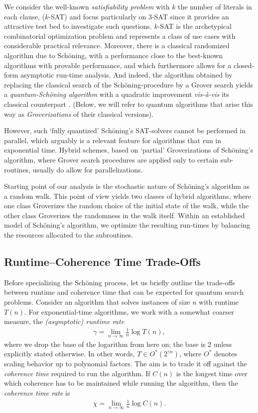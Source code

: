 \documentclass[a4paper,aps,floatfix]{revtex4}
\begin{document}
We consider the well-known \emph{satisfiability problem} with $k$ the number of literals in each clause, ($k$-SAT) and focus particularly on $3$-SAT since it provides an attractive test bed to investigate such questions. $k$-SAT is the archetypical combinatorial optimization problem and represents a class of use cases with considerable practical relevance. 
Moreover, there is a classical randomized algorithm \cite{Schoening99,SchoeningToranBook}
due to Sch\"oning, with a performance close to the best-known algorithms with provable performance, and which furthermore allows for a closed-form asymptotic run-time analysis. And indeed, the algorithm obtained by replacing the classical search of the Sch\"oning-procedure by a Grover search \cite{Grover96} yields a \emph{quantum-Sch\"oning algorithm} with a quadratic improvement \emph{vis-\`a-vis} its classical counterpart \cite{Ambainis04}. 
(Below, we will refer to quantum algorithms that arise this way as \emph{Groverizations} of their classical versions).

However, such `fully quantized' Sch\"oning's SAT-solvers cannot be performed in parallel, which arguably is a relevant feature for algorithms that run in exponential time. Hybrid schemes, based on `partial' Groverizations of Sch\"oning's algorithm, where Grover search procedures are applied only to certain sub-routines, usually do allow for parallelizations.

Starting point of our analysis is the stochastic nature of Sch\"oning's algorithm as a random walk. 
This point of view yields two classes of hybrid algorithms, where one class Groverizes the random choice of the initial state of the walk, while the other class Groverizes the randomness in the walk itself. 
Within an established model of Sch\"oning's algorithm, we optimize the resulting run-times by balancing the resources allocated to the subroutines.

\subsection{Runtime--Coherence Time Trade-Offs}
\label{sec:run_vs_coherence}

Before specializing the Sch\"oning process, let us briefly outline the trade-offs between runtime and coherence time that can be expected for quantum search problems. 
Consider an algorithm that solves instances of size $n$ with runtime $T(n)$.
For exponential-time algorithms, we work with a somewhat coarser measure, the \emph{(asymptotic) runtime rate} 
\begin{align*}
	\gamma=\lim_{n\to\infty} \frac1n \log T(n),
\end{align*}
where we drop the base of the logarithm from here on; the base is $2$ unless explicitly stated otherwise.
In other words, $T\in O^*(2^{\gamma n})$, where 
$O^*$ denotes scaling behavior up to polynomial factors.
The aim is to trade it off against the \emph{coherence time} required to run the algorithm.
If $C(n)$ is the longest time over which coherence has to be maintained while running the algorithm, then the \emph{coherence time rate} is
\begin{align*}
	\chi=\lim_{n\to\infty} \frac1n \log C(n).
\end{align*}
\end{document}
